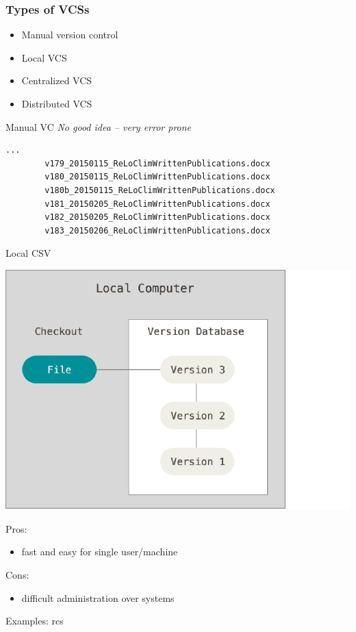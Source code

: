 \documentclass{beamer}
\begin{document}
\begin{frame}[fragile]
  \frametitle{Types of VCSs}
  \begin{itemize}
  \item<1-> Manual version control
  \item<2-> Local VCS
  \item<3-> Centralized VCS
  \item<4-> Distributed VCS
  \end{itemize}

  \begin{overprint}
    \begin{alertblock}{Manual VC}
      \emph{No good idea -- very error prone}
      \begin{lstlisting}[language=bash]
        ...
        v179_20150115_ReLoClimWrittenPublications.docx
        v180_20150115_ReLoClimWrittenPublications.docx
        v180b_20150115_ReLoClimWrittenPublications.docx
        v181_20150205_ReLoClimWrittenPublications.docx
        v182_20150205_ReLoClimWrittenPublications.docx
        v183_20150206_ReLoClimWrittenPublications.docx
      \end{lstlisting}
    \end{alertblock}

    \begin{block}{Local CSV}
      \begin{minipage}{.5\linewidth}
        \includegraphics[width=\textwidth]{local}        
      \end{minipage}\hfill
      \begin{minipage}{.5\linewidth}\small
        Pros:
        \begin{itemize}
          \item fast and easy for single user/machine
        \end{itemize}
        Cons:
        \begin{itemize}
          \item difficult administration over systems
        \end{itemize}
        Examples: rcs
      \end{minipage}


\end{block}
\end{overprint}
\end{frame}
\end{document}
